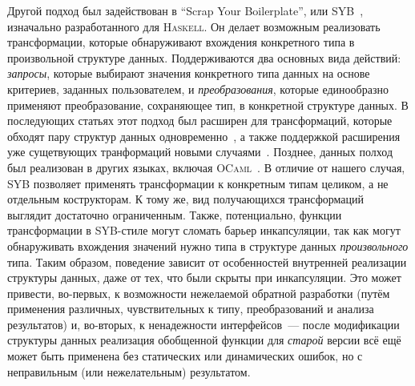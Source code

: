Другой подход был задействован в ``Scrap Your Boilerplate'', или SYB~\cite{SYB}, изначально разработанного для  \textsc{Haskell}. Он делает возможным реализовать трансформации,  которые обнаруживают вхождения конкретного типа в произвольной структуре данных. Поддерживаются два основных вида действий: \emph{запросы}, которые выбирают значения конкретного типа данных на основе критериев, заданных пользователем, и \emph{преобразования}, которые единообразно применяют преобразование, сохраняющее тип, в конкретной структуре данных. В последующих статьях этот подход был расширен для трансформаций, которые обходят пару структур данных одновременно~\cite{SYB1}, а также поддержкой расширения уже сущетвующих транформаций новыми случаями~\cite{SYB2}. Позднее, данных полход был реализован в других языках, включая \textsc{OCaml}~\cite{SYBOCaml,Staged}. В отличие от нашего случая, SYB позволяет применять трансформации к конкретным типам целиком, а не отдельным кострукторам. К тому же, вид получающихся трансформаций выглядит достаточно ограниченным. Также, потенциально, функции трансформации в SYB-стиле могут сломать барьер инкапсуляции, так как могут обнаруживать вхождения значений нужно типа в структуре данных \emph{произвольного} типа. Таким образом, поведение зависит от особенностей внутренней реализации структуры данных, даже от тех, что были скрыты при инкапсуляции. Это может привести, во-первых, к возможности нежелаемой обратной разработки (путём применения различных, чувствительных к типу, преобразований и анализа результатов) и, во-вторых, к ненадежности интерфейсов~--- после модификации структуры данных реализация обобщенной функции для \emph{старой} версии всё ещё может быть применена без статических или динамических ошибок, но с неправильным (или нежелательным) результатом.

